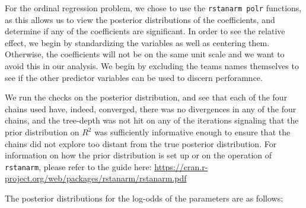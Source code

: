 \documentclass[10pt,a4paper, hidelinks]{article} %
\begin{document}
For the ordinal regression problem, we chose to use the \texttt{rstanarm polr} functions, as this allows us to view the posterior distributions of the coefficients, and determine if any of the coefficients are significant. In order to see the relative effect, we begin by standardizing the variables as well as centering them. Otherwise, the coefficients will not be on the same unit scale and we want to avoid this in our analysis. We begin by excluding the teams names themselves to see if the other predictor variables can be used to discern perforamnce. 

We run the checks on the posterior distribution, and see that each of the four chains used have, indeed, converged, there was no divergences in any of the four chains, and the tree-depth was not hit on any of the iterations signaling that the prior distribution on $R^2$ was sufficiently informative enough to ensure that the chains did not explore too distant from the true posterior distribution. For information on how the prior distribution is set up or on the operation of \texttt{rstanarm}, please refer to the guide here: {\color{blue} \url{https://cran.r-project.org/web/packages/rstanarm/rstanarm.pdf}}

The posterior distributions for the log-odds of the parameters are as follows:
\end{document}
